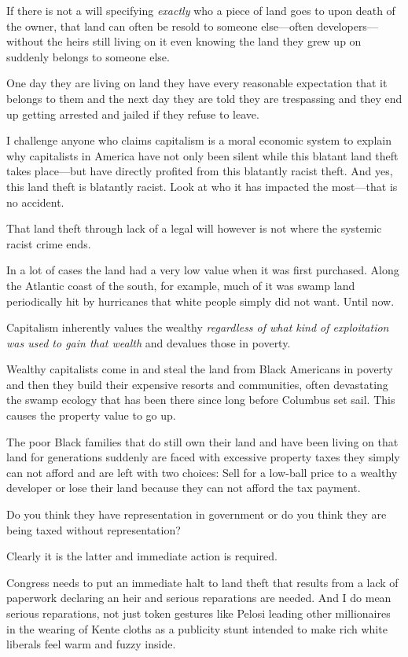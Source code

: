 If there is not a will specifying \emph{exactly} who a piece of land goes to upon death of the owner, that land can often be resold to someone else---often developers---without the heirs still living on it even knowing the land they grew up on suddenly belongs to someone else.

One day they are living on land they have every reasonable expectation that it belongs to them and the next day they are told they are trespassing and they end up getting arrested and jailed if they refuse to leave.

I challenge anyone who claims capitalism is a moral economic system to explain why capitalists in America have not only been silent while this blatant land theft takes place---but have directly profited from this blatantly racist theft. And yes, this land theft is blatantly racist. Look at who it has impacted the most---that is no accident.

That land theft through lack of a legal will however is not where the systemic racist crime ends.

In a lot of cases the land had a very low value when it was first purchased. Along the Atlantic coast of the south, for example, much of it was swamp land periodically hit by hurricanes that white people simply did not want. Until now.

Capitalism inherently values the wealthy \emph{regardless of what kind of exploitation was used to gain that wealth} and devalues those in poverty.

Wealthy capitalists come in and steal the land from Black Americans in poverty and then they build their expensive resorts and communities, often devastating the swamp ecology that has been there since long before Columbus set sail. This causes the property value to go up.

The poor Black families that do still own their land and have been living on that land for generations suddenly are faced with excessive property taxes they simply can not afford and are left with two choices: Sell for a low-ball price to a wealthy developer or lose their land because they can not afford the tax payment.

Do you think they have representation in government or do you think they are being taxed without representation?

Clearly it is the latter and immediate action is required.

Congress needs to put an immediate halt to land theft that results from a lack of paperwork declaring an heir and serious reparations are needed. And I do mean serious reparations, not just token gestures like Pelosi leading other millionaires in the wearing of Kente cloths as a publicity stunt intended to make rich white liberals feel warm and fuzzy inside.

